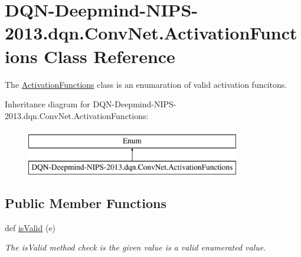 \hypertarget{classDQN-Deepmind-NIPS-2013_1_1dqn_1_1ConvNet_1_1ActivationFunctions}{}\section{D\+Q\+N-\/\+Deepmind-\/\+N\+I\+P\+S-\/2013.dqn.\+Conv\+Net.\+Activation\+Functions Class Reference}
\label{classDQN-Deepmind-NIPS-2013_1_1dqn_1_1ConvNet_1_1ActivationFunctions}


The \hyperlink{classDQN-Deepmind-NIPS-2013_1_1dqn_1_1ConvNet_1_1ActivationFunctions}{Activation\+Functions} class is an enumaration of valid activation funcitons.  


Inheritance diagram for D\+Q\+N-\/\+Deepmind-\/\+N\+I\+P\+S-\/2013.dqn.\+Conv\+Net.\+Activation\+Functions\+:\begin{figure}[H]
\begin{center}
\leavevmode
\includegraphics[height=2.000000cm]{classDQN-Deepmind-NIPS-2013_1_1dqn_1_1ConvNet_1_1ActivationFunctions}
\end{center}
\end{figure}
\subsection*{Public Member Functions}
\begin{DoxyCompactItemize}
\item 
def \hyperlink{classDQN-Deepmind-NIPS-2013_1_1dqn_1_1ConvNet_1_1ActivationFunctions_a5fc485b9d50dac40bc4db3ba6ca678cc}{is\+Valid} (e)
\begin{DoxyCompactList}\small\item\em The is\+Valid method check is the given value is a valid enumerated value. \end{DoxyCompactList}\end{DoxyCompactItemize}
